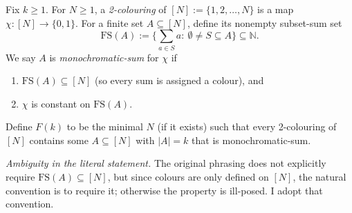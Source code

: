 Fix $k\ge 1$. For $N\ge 1$, a \emph{2-colouring} of $[N]:=\{1,2,\dots,N\}$ is a map $\chi:[N]\to\{0,1\}$. For a finite set $A\subseteq [N]$, define its nonempty subset-sum set
\[
\mathrm{FS}(A):=\Big\{\sum_{a\in S}a:\ \emptyset\ne S\subseteq A\Big\}\subseteq \mathbb N.
\]
We say $A$ is \emph{monochromatic-sum} for $\chi$ if
\begin{enumerate}
\item $\mathrm{FS}(A)\subseteq [N]$ (so every sum is assigned a colour), and
\item $\chi$ is constant on $\mathrm{FS}(A)$.
\end{enumerate}
Define $F(k)$ to be the minimal $N$ (if it exists) such that every 2-colouring of $[N]$ contains some $A\subseteq [N]$ with $|A|=k$ that is monochromatic-sum.

\emph{Ambiguity in the literal statement.} The original phrasing does not explicitly require $\mathrm{FS}(A)\subseteq [N]$, but since colours are only defined on $[N]$, the natural convention is to require it; otherwise the property is ill-posed. I adopt that convention.
